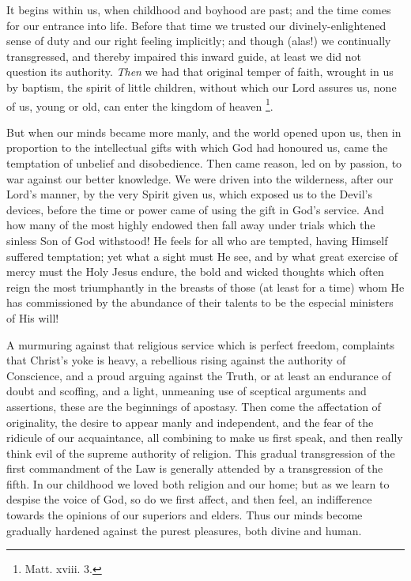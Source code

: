 It begins within us, when childhood and boyhood are
past; and the time comes for our entrance into life.
Before that time we trusted our divinely-enlightened sense of duty and our right feeling implicitly; and
though (alas!) we continually transgressed, and thereby
impaired this inward guide, at least we did not question
its authority. \emph{Then} we had that original temper
of faith, wrought in us by baptism, the spirit of little
children, without which our Lord assures us, none of us,
young or old, can enter the kingdom of heaven \footnote{Matt. xviii. 3.}.

But when our minds became more manly, and the world
opened upon us, then in proportion to the intellectual
gifts with which God had honoured us, came the temptation
of unbelief and disobedience. Then came reason, led on by
passion, to war against our better knowledge. We were
driven into the wilderness, after our Lord's manner, by
the very Spirit given us, which exposed us to the Devil's
devices, before the time or power came of using the gift
in God's service. And how many of the most highly endowed
then fall away under trials which the sinless Son of God
withstood! He feels for all who are tempted, having
Himself suffered temptation; yet what a sight must He
see, and by what great exercise of mercy must the Holy
Jesus endure, the bold and wicked thoughts which often
reign the most triumphantly in the breasts of those (at
least for a time) whom He has commissioned by the
abundance of their talents to be the especial ministers
of His will!

A murmuring against that religious service which is
perfect freedom, complaints that Christ's yoke is heavy,
a rebellious rising against the authority of Conscience,
and a proud arguing against the Truth, or at least an endurance of doubt and scoffing, and a light, unmeaning
use of sceptical arguments and assertions, these are the
beginnings of apostasy. Then come the affectation of
originality, the desire to appear manly and independent,
and the fear of the ridicule of our acquaintance, all
combining to make us first speak, and then really think
evil of the supreme authority of religion. This gradual
transgression of the first commandment of the Law is
generally attended by a transgression of the fifth. In
our childhood we loved both religion and our home; but as
we learn to despise the voice of God, so do we first
affect, and then feel, an indifference towards the
opinions of our superiors and elders. Thus our minds
become gradually hardened against the purest pleasures,
both divine and human.

